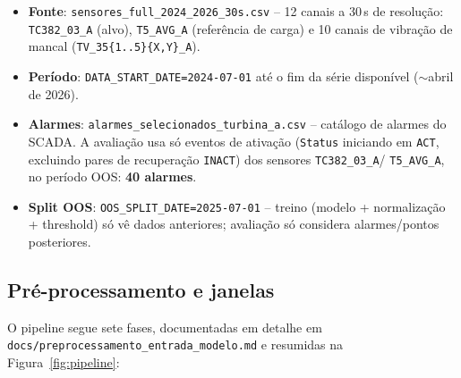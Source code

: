 \documentclass[11pt,a4paper]{article}
\begin{document}
\begin{itemize}[leftmargin=1.4em]
  \item \textbf{Fonte}: \texttt{sensores\_full\_2024\_2026\_30s.csv} --
    12 canais a 30\,s de resolução: \texttt{TC382\_03\_A} (alvo),
    \texttt{T5\_AVG\_A} (referência de carga) e 10 canais de vibração
    de mancal (\texttt{TV\_35\{1..5\}\{X,Y\}\_A}).
  \item \textbf{Período}: \texttt{DATA\_START\_DATE=2024-07-01} até o
    fim da série disponível ($\sim$abril de 2026).
  \item \textbf{Alarmes}: \texttt{alarmes\_selecionados\_turbina\_a.csv}
    -- catálogo de alarmes do SCADA. A avaliação usa só eventos de
    ativação (\texttt{Status} iniciando em \texttt{ACT}, excluindo
    pares de recuperação \texttt{INACT}) dos sensores \texttt{TC382\_03\_A}/
    \texttt{T5\_AVG\_A}, no período OOS: \textbf{40 alarmes}.
  \item \textbf{Split OOS}: \texttt{OOS\_SPLIT\_DATE=2025-07-01} --
    treino (modelo + normalização + threshold) só vê dados anteriores;
    avaliação só considera alarmes/pontos posteriores.
\end{itemize}

\subsection{Pré-processamento e janelas}

O pipeline segue sete fases, documentadas em detalhe em
\texttt{docs/preprocessamento\_entrada\_modelo.md} e resumidas na
Figura~\ref{fig:pipeline}:
\end{document}
